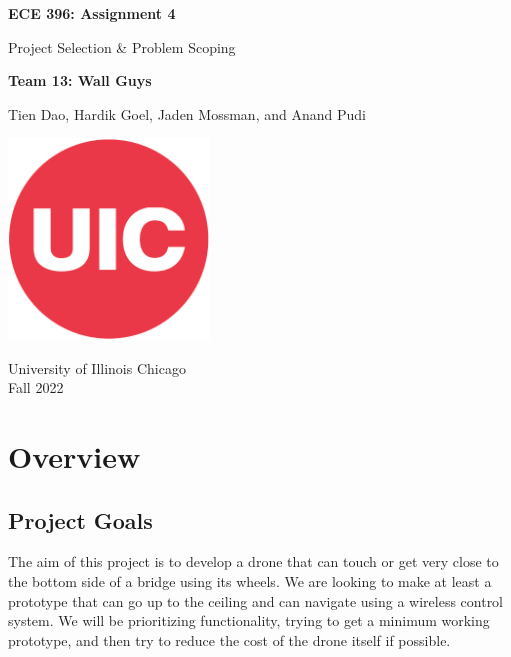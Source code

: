 \documentclass[12pt]{article}
\begin{document}
    \begin{titlepage}
        \begin{center}
            \vspace*{1cm}
            \Huge\textbf{ECE 396: Assignment 4}

                \vspace{0.5cm}
                \LARGE Project Selection \& Problem Scoping
    
            \vspace{1.5cm}
            \textbf{Team 13: Wall Guys}

                \vspace{0.5cm}
                Tien Dao, Hardik Goel, Jaden Mossman, and Anand Pudi

            \vfill             
            \includegraphics[width=0.4\textwidth]{resources/uic_logo.png}

            \vspace{0.8cm}
            University of Illinois Chicago\\
            Fall 2022
                
        \end{center}
    \end{titlepage}

    \tableofcontents

    \newpage

    \section{Overview}

        \subsection{Project Goals}
            The aim of this project is to develop a drone that can touch or get very close to the bottom side of a bridge using its wheels. We are looking to make at least a prototype that can go up to the ceiling and can navigate using a wireless control system. We will be prioritizing functionality, trying to get a minimum working prototype, and then try to reduce the cost of the drone itself if possible.
\end{document}
